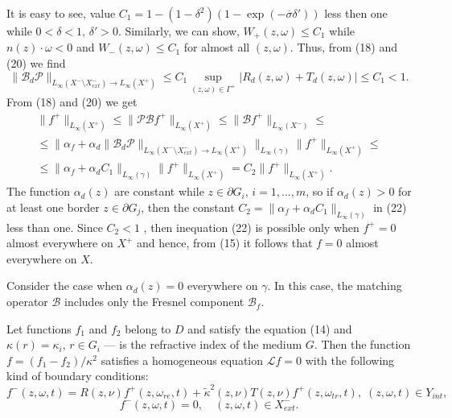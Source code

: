 \documentclass[12pt,reqno]{report}
\begin{document}
It is easy to see, value $C_1=1-(1-\delta^2)(1-\exp \left (- \overline{\sigma} \delta'\right))$ less then one while $0<\delta<1,\,\delta'>0$.
Similarly, we can show, $W_+(z,\omega) \leq C_1$ while $n(z) \cdot \omega<0$ and $W_-(z,\omega) \leq C_1$ for almost all $(z,\omega)$. 
Thus, from (18) and (20) we find
\begin{equation}
\|\mathcal B_d \mathcal  P  \|_{L_{\infty}(X^-\setminus X^-_{ext})\to L_{\infty}(X^+)}  \leq    
C_1 \sup \limits_{(z,\omega) \in \Gamma^+}\left| R_d (z,\omega)+ T_d (z,\omega) \right| \leq C_1<1.
\end{equation}
From (18) and (20) we get
\begin{multline}
\|f^+\|_{L_{\infty}(X^+)} \leq \|\mathcal P \mathcal B f^+\|_{L_{\infty}(X^+)} 
\leq 
\| \mathcal B f^+\|_{L_{\infty}(X^-)} 
\leq \\ \leq 
\|\alpha_f +\alpha_d \|\mathcal  B_d \mathcal P \|_{L_{\infty}(X^-\setminus X^-_{ext})\to L_{\infty}(X^+)} \|_{L_{\infty}(\gamma)}  \|  f^+\|_{L_{\infty}(X^+)} \leq \\ \leq 
 \|\alpha_f  +\alpha_d C_1 \|_{L_{\infty}(\gamma)}  \| f^+\|_{L_{\infty}(X^+)}= C_2\| f^+\|_{L_{\infty}(X^+)}.
\end{multline}
The function $\alpha_d(z)$  are constant while $z\in \partial G_i$, $i=1,...,m$, so if $\alpha_d(z)>0$ for at least one border $z\in \partial G_j$, then the constant $C_2= \|\alpha_f  +\alpha_d C_1 \|_{L_{\infty}(\gamma)}$ in (22) less than one. Since $C_2<1$ , then inequation (22) is possible only when $f^+=0$ almost everywhere on $X^+$ and hence, from (15) it follows that $f = 0$ almost everywhere on $X$.

Consider the case when $ \alpha_d (z) = 0 $ everywhere on $\gamma$. In this case, the matching operator $\mathcal B$ includes only the Fresnel component $\mathcal B_f $.

Let functions $f_1$ and $f_2$ belong to $D$ and satisfy the equation (14) and $ \kappa(r) = \kappa_i, \, r \in G_i $ ---
is the refractive index of the medium $G$. Then the function $f=(f_1-f_2)/\kappa^2$ satisfies a homogeneous equation
${\mathcal L} f = 0$ with the following kind of boundary conditions:
\begin{equation}
f^-(z,\omega,t)=R (z,\nu) f^+(z,\omega_{re},t) +
\widetilde{\kappa}^2(z,\nu) T(z,\nu) f^+(z,\omega_{tr},t), \;
(z,\omega,t) \in Y_{int},
\end{equation}
\begin{equation}
f^-(z,\omega,t)=0, \quad (z,\omega,t) \in X^-_{ext}.
\end{equation}
\end{document}
